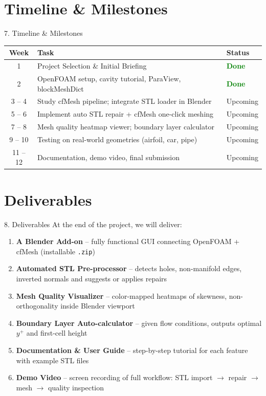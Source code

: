 \documentclass[dvipsnames,mathserif]{beamer}
\begin{document}
\section{Timeline \& Milestones}
\begin{frame}{7. Timeline \& Milestones}
    \begin{table}
    \centering
    \footnotesize
    \begin{tabular}{|c|l|l|}
    \hline
    \textbf{Week} & \textbf{Task} & \textbf{Status} \\ \hline
    1 & Project Selection \& Initial Briefing & \textcolor{green}{\textbf{Done}} \\ \hline
    2 & OpenFOAM setup, cavity tutorial, ParaView, blockMeshDict & \textcolor{green}{\textbf{Done}} \\ \hline
    3 -- 4 & Study cfMesh pipeline; integrate STL loader in Blender & Upcoming \\ \hline
    5 -- 6 & Implement auto STL repair + cfMesh one-click meshing & Upcoming \\ \hline
    7 -- 8 & Mesh quality heatmap viewer; boundary layer calculator & Upcoming \\ \hline
    9 -- 10 & Testing on real-world geometries (airfoil, car, pipe) & Upcoming \\ \hline
    11 -- 12 & Documentation, demo video, final submission & Upcoming \\ \hline
    \end{tabular}
    \end{table}
\end{frame}


\section{Deliverables}
\begin{frame}{8. Deliverables}
    At the end of the project, we will deliver:
    \vspace{0.2cm}
    \begin{enumerate}
        \item \textbf{A Blender Add-on} -- fully functional GUI connecting OpenFOAM + cfMesh (installable \texttt{.zip})
        \item \textbf{Automated STL Pre-processor} -- detects holes, non-manifold edges, inverted normals and suggests or applies repairs
        \item \textbf{Mesh Quality Visualizer} -- color-mapped heatmaps of skewness, non-orthogonality inside Blender viewport
        \item \textbf{Boundary Layer Auto-calculator} -- given flow conditions, outputs optimal $y^+$ and first-cell height
        \item \textbf{Documentation \& User Guide} -- step-by-step tutorial for each feature with example STL files
        \item \textbf{Demo Video} -- screen recording of full workflow: STL import $\rightarrow$ repair $\rightarrow$ mesh $\rightarrow$ quality inspection
    \end{enumerate}
\end{frame}
\end{document}
